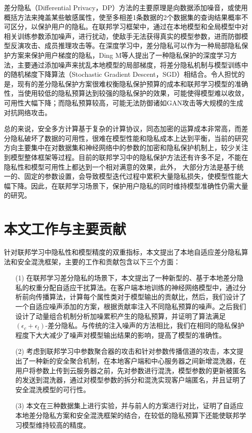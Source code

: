 差分隐私（Differential Privacy，DP）方法的主要原理是向数据添加噪音，或使用概括方法来掩盖某些敏感属性，使至多相差1条数据的2个数据集的查询结果概率不可区分，以保护用户的隐私。在联邦学习框架中，通过在本地模型和全局模型中对相关训练参数添加噪声，进行扰动，使敌手无法获得真实的模型参数，进而防御模型反演攻击、成员推理攻击等。在深度学习中，差分隐私可以作为一种局部隐私保护方案来保护用户梯度的隐私，Ding M等人提出了一种隐私保护的深度学习方法，主要通过添加噪声来扰乱本地模型的局部梯度，将差分隐私机制与模型训练中的随机梯度下降算法（Stochastic Gradient Descent，SGD）相结合。令人担忧的是，现有的差分隐私保护方案很难权衡隐私保护预算的成本和联邦学习模型的准确性，当使用较低的隐私预算达到较强的隐私保护的效果，可能使得模型难以收敛，可用性大幅下降；而隐私预算较高，可能无法防御诸如GAN攻击等大规模的生成对抗网络攻击。

总的来说，安全多方计算基于复杂的计算协议，同态加密的运算成本非常高，而差分隐私破坏了数据的可用性，很难在模型性能和隐私成本上达到平衡，当前的研究方向主要集中在对数据集和神经网络中的参数的加密和隐私保护机制上，较少关注到模型整体框架等过程。目前的联邦学习中的隐私保护方法还有许多不足，不能在隐私性和模型可用性上都达到一个相对满意的效果，此外， 大部分方法是基于统一的、固定的参数设置，会导致模型迭代过程中累积大量隐私损失，使模型性能大幅下降。因此，在联邦学习场景下，保护用户隐私的同时维持模型准确性仍需大量的研究。

\section{本文工作与主要贡献}
针对联邦学习中隐私性和模型精度的双重指标，本文提出了本地自适应差分隐私算法和安全混洗框架，主要的工作和贡献包含以下三个方面：
\begin{enumerate}
\item [(1)] 在联邦学习差分隐私的场景下，本文提出了一种新型的、基于本地差分隐私的权重分配自适应干扰算法。在客户端本地训练的神经网络模型中，通过分析前向传播算法，计算每个属性类对于模型输出的贡献比，然后，我们设计了一个自适应噪声添加的方案，根据贡献率注入不同隐私预算的噪声。之后我们设计了动量组合机制分析加噪累积产生的隐私预算，并证明了算法满足$\left(\epsilon_{c}+\epsilon_{l}\right)$-差分隐私。与传统的注入噪声的方法相比，我们在相同的隐私保护程度下大大减少了噪声对模型输出结果的影响，提高了模型的准确性。
\item [(2)] 考虑到联邦学习中参数聚合器的攻击和针对参数传播信道的攻击，本文提出了一种新的安全聚合机制，在本地客户端和中心服务器之间新增混洗器，在用户将参数上传到云服务器之前，先对参数进行混洗，模型参数的更新被匿名的发送到混洗器，通过对模型参数的拆分和混洗实现客户端匿名，并且证明了安全混洗模型的可行性。
\item [(3)] 本文在三种数据集上进行实验，并与前人的方案进行对比，证明了自适应本地差分隐私方案和安全混洗框架的结合，在较低的隐私预算下还能使联邦学习模型维持较高的精度。
\end{enumerate}

